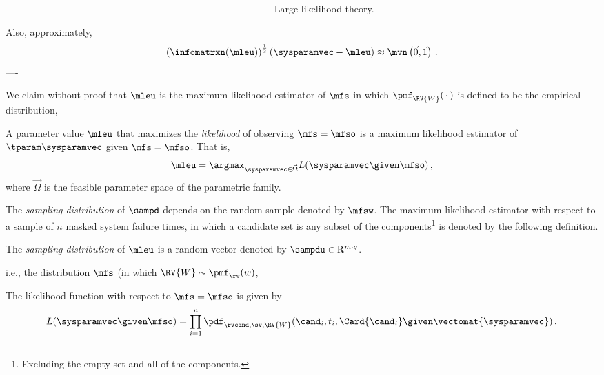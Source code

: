\documentclass[../main.tex]{subfiles}
\begin{document}
-----------------------------------------------------------------------------------
Large likelihood theory.


Also, approximately, 
\begin{equation}
    \left(\infomatrxn(\mleu)\right)^{\frac{1}{2}}\left(\sysparamvec - \mleu\right) \approx \mvn\left(\vec{0}, \vec{1}\right)\,.
\end{equation}
----























We claim without proof that $\mleu$ is the maximum likelihood estimator of $\mfs$ in which $\pmf_{\RV{W}}(\,\cdot\,)$ is defined to be the empirical distribution,


\begin{definition}
\label{def:general_mleu}
A parameter value $\mleu$ that maximizes the \emph{likelihood} of observing $\mfs = \mfso$ is a maximum likelihood estimator of $\tparam\sysparamvec$ given $\mfs = \mfso$. That is,
\begin{equation}
\label{eq:general_mleu}
\mleu = \argmax_{\sysparamvec \in \vec\Omega} L(\sysparamvec \given \mfso)\,,
\end{equation}
where $\vec\Omega$ is the feasible parameter space of the parametric family.
\end{definition}

The \emph{sampling distribution} of $\sampd$ depends on the random sample denoted by $\mfsw$. The maximum likelihood estimator with respect to a sample of $n$ masked system failure times, in which a candidate set is any subset of the components\footnote{Excluding the empty set and all of the components.} is denoted by the following definition.
\begin{definition}
The \emph{sampling distribution} of $\mleu$ is a random vector denoted by $\sampdu \in \mathrm{R}^{m \cdot q}$.
\end{definition}
i.e., the distribution $\mfs$ (in which $\RV{W} \sim \pmf_{\rv}(w)$,


The likelihood function with respect to $\mfs = \mfso$ is given by
\begin{equation}
    L(\sysparamvec \given \mfso) = \prod_{i=1}^{n} \pdf_{\rvcand, \sv, \RV{W}}(\cand_i, t_i, \Card{\cand_i} \given \vectomat{\sysparamvec})\,.
\end{equation}
\end{document}
